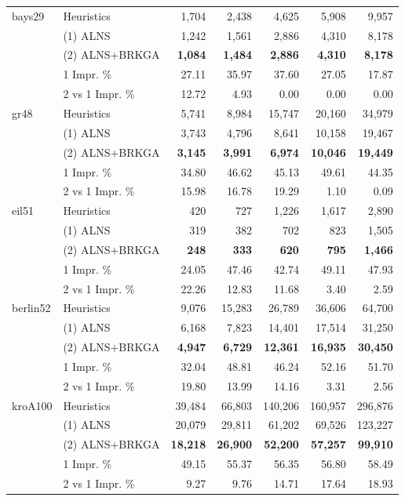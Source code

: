 \documentclass{article}
\begin{document}
\begin{longtable}{p{1.5cm}|p{3cm}|r|r|r|r|r}
bays29 & Heuristics & 1,704 & 2,438 & 4,625 & 5,908 & 9,957 \\
  & (1) ALNS & 1,242 & 1,561 & 2,886 & 4,310 & 8,178 \\
  & (2) ALNS+BRKGA & \textbf{1,084} & \textbf{1,484} & \textbf{2,886} & \textbf{4,310} & \textbf{8,178} \\
 & 1 Impr. \% &27.11 & 35.97 & 37.60 & 27.05 & 17.87 \\
& 2 vs 1 Impr. \% & 12.72 & 4.93 & 0.00 & 0.00 & 0.00 \\
\midrule

gr48 & Heuristics & 5,741 & 8,984 & 15,747 & 20,160 & 34,979 \\
  & (1) ALNS & 3,743 & 4,796 & 8,641 & 10,158 & 19,467 \\
  & (2) ALNS+BRKGA & \textbf{3,145} & \textbf{3,991} & \textbf{6,974} & \textbf{10,046} & \textbf{19,449} \\
 & 1 Impr. \% &34.80 & 46.62 & 45.13 & 49.61 & 44.35 \\
& 2 vs 1 Impr. \% & 15.98 & 16.78 & 19.29 & 1.10 & 0.09 \\
\midrule

eil51 & Heuristics & 420 & 727 & 1,226 & 1,617 & 2,890 \\
  & (1) ALNS & 319 & 382 & 702 & 823 & 1,505 \\
  & (2) ALNS+BRKGA & \textbf{248} & \textbf{333} & \textbf{620} & \textbf{795} & \textbf{1,466} \\
 & 1 Impr. \% &24.05 & 47.46 & 42.74 & 49.11 & 47.93 \\
& 2 vs 1 Impr. \% & 22.26 & 12.83 & 11.68 & 3.40 & 2.59 \\

\midrule
berlin52 & Heuristics & 9,076 & 15,283 & 26,789 & 36,606 & 64,700 \\
  & (1) ALNS & 6,168 & 7,823 & 14,401 & 17,514 & 31,250 \\
  & (2) ALNS+BRKGA & \textbf{4,947} & \textbf{6,729} & \textbf{12,361} & \textbf{16,935} & \textbf{30,450} \\
 & 1 Impr. \% &32.04 & 48.81 & 46.24 & 52.16 & 51.70 \\
& 2 vs 1 Impr. \% & 19.80 & 13.99 & 14.16 & 3.31 & 2.56 \\
\midrule

kroA100 & Heuristics & 39,484 & 66,803 & 140,206 & 160,957 & 296,876 \\
  & (1) ALNS & 20,079 & 29,811 & 61,202 & 69,526 & 123,227 \\
  & (2) ALNS+BRKGA & \textbf{18,218} & \textbf{26,900} & \textbf{52,200} & \textbf{57,257} & \textbf{99,910} \\
 & 1 Impr. \% &49.15 & 55.37 & 56.35 & 56.80 & 58.49 \\
& 2 vs 1 Impr. \% & 9.27 & 9.76 & 14.71 & 17.64 & 18.93 \\
\midrule


\end{longtable}
\end{document}
